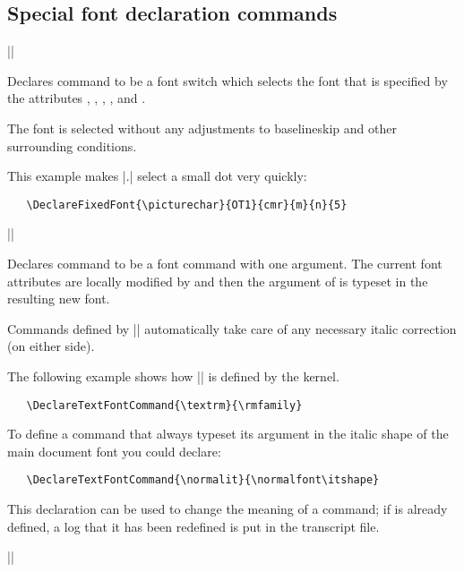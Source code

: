 \documentclass{ltxguide}[1995/11/28]
\begin{document}
\subsection{Special font declaration commands}

\begin{decl}
  |\DeclareFixedFont|    
                       
\end{decl}

Declares command  to be a font switch which selects the font that
is specified by the attributes , , ,
, and .

The font is selected without any adjustments to baselineskip and other
surrounding conditions.

This example makes |{\picturechar .}| select a small dot very quickly:
\begin{verbatim}
   \DeclareFixedFont{\picturechar}{OT1}{cmr}{m}{n}{5}
\end{verbatim}

\begin{decl}
|\DeclareTextFontCommand|  
\end{decl}

Declares command  to be a font command with one argument.  The
current font attributes are locally modified by  and
then the argument of  is typeset in the resulting new font.

Commands defined by |\DeclareTextFontCommand| automatically take care of
any necessary italic correction (on either side).

The following example shows how |\textrm| is defined by the kernel.
\begin{verbatim}
   \DeclareTextFontCommand{\textrm}{\rmfamily}
\end{verbatim}

To define a command that always typeset its argument in the italic shape
of the main document font you could declare:
\begin{verbatim}
   \DeclareTextFontCommand{\normalit}{\normalfont\itshape}
\end{verbatim}

This declaration can be used to change the meaning of a command; if
 is already defined, a log that it has been redefined is put in
the transcript file.

\begin{decl}
  |\DeclareOldFontCommand|  
\end{decl}
\end{document}

